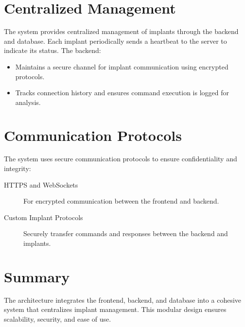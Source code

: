 \section{Centralized Management}
The system provides centralized management of implants through the backend and database. Each implant periodically sends a heartbeat to the server to indicate its status. The backend:
\begin{itemize}
    \item Maintains a secure channel for implant communication using encrypted protocols.
    \item Tracks connection history and ensures command execution is logged for analysis.
\end{itemize}

\section{Communication Protocols}
The system uses secure communication protocols to ensure confidentiality and integrity:
\begin{description}
    \item[HTTPS and WebSockets] For encrypted communication between the frontend and backend.
    \item[Custom Implant Protocols] Securely transfer commands and responses between the backend and implants.
\end{description}

\section{Summary}
The architecture integrates the frontend, backend, and database into a cohesive system that centralizes implant management. This modular design ensures scalability, security, and ease of use.


